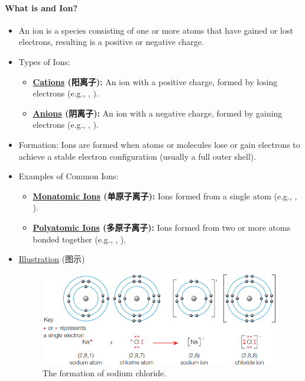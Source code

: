 \paragraph{What is and Ion?}
\begin{itemize}
    \item An ion is a species consisting of one or more atoms that have gained or lost electrons, resulting is a positive or
    negative charge.
    \item Types of Ions:
    \begin{itemize}
        \item \textbf{\underline{Cations} (阳离子):} An ion with a positive charge, formed by losing electrons (e.g., ,
        ).
        \item \textbf{\underline{Anions} (阴离子):} An ion with a negative charge, formed by gaining electrons (e.g., ,
        ).
    \end{itemize}
    \item Formation: Ions are formed when atoms or molecules lose or gain electrons to achieve a stable electron configuration
    (usually a full outer shell).
    \item Examples of Common Ions:
    \begin{itemize}
        \item \textbf{\underline{Monatomic Ions} (单原子离子):} Ions formed from a single atom (e.g., , ).
        \item \textbf{\underline{Polyatomic Ions} (多原子离子):} Ions formed from two or more atoms bonded together (e.g.,
        , ).
    \end{itemize}
    \item \underline{Illustration} (图示)
    \begin{figure}[H]
        \centering
        \includegraphics[scale=0.6]{Biology/1A/Images/1A-1-1.png}
        \caption{The formation of sodium chloride.}
    \end{figure}
\end{itemize}

